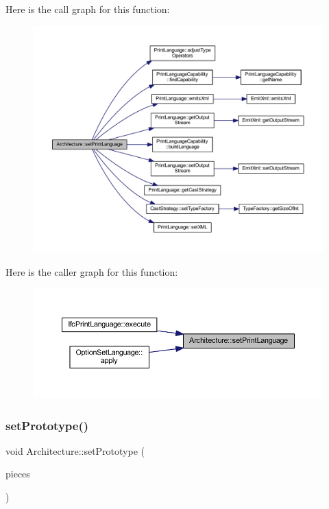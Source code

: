 Here is the call graph for this function\+:
\nopagebreak
\begin{figure}[H]
\begin{center}
\leavevmode
\includegraphics[width=350pt]{class_architecture_ae002322a1fd364665099cbe3f98b63a6_cgraph}
\end{center}
\end{figure}
Here is the caller graph for this function\+:
\nopagebreak
\begin{figure}[H]
\begin{center}
\leavevmode
\includegraphics[width=350pt]{class_architecture_ae002322a1fd364665099cbe3f98b63a6_icgraph}
\end{center}
\end{figure}
\mbox{\label{class_architecture_a10d78ec7be0df339288b7b3adc4c38e7}} 
\subsubsection{\texorpdfstring{setPrototype()}{setPrototype()}}
{\footnotesize\ttfamily void Architecture\+::set\+Prototype (\begin{DoxyParamCaption}\item[{const \mbox{\hyperlink{struct_prototype_pieces}{Prototype\+Pieces}} \&}]{pieces }\end{DoxyParamCaption})}



